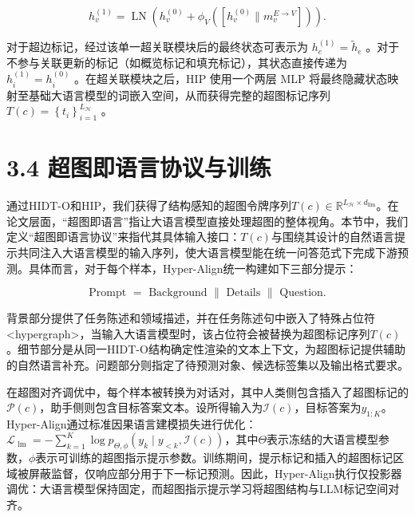 \documentclass[10pt]{article}
\begin{document}
\[
{h}_{v}^{\left( 1\right) } = \operatorname{LN}\left( {{h}_{v}^{\left( 0\right) } + {\phi }_{V}\left( \left\lbrack  {{h}_{v}^{\left( 0\right) }\parallel {m}_{v}^{E \rightarrow  V}}\right\rbrack  \right) }\right) . \tag{10}
\]

对于超边标记，经过该单一超关联模块后的最终状态可表示为 \({h}_{e}^{\left( 1\right) } = {\widetilde{h}}_{e}\) 。对于不参与关联更新的标记（如概览标记和填充标记），其状态直接传递为 \({h}_{i}^{\left( 1\right) } = {h}_{i}^{\left( 0\right) }\) 。在超关联模块之后，HIP 使用一个两层 MLP 将最终隐藏状态映射至基础大语言模型的词嵌入空间，从而获得完整的超图标记序列 \(T\left( c\right)  = {\left\{  {t}_{i}\right\}  }_{i = 1}^{{L}_{\mathcal{H}}}\) 。

\section*{3.4 超图即语言协议与训练}

通过HIDT-O和HIP，我们获得了结构感知的超图令牌序列\(T\left( c\right)  \in{\mathbb{R}}^{{L}_{\mathcal{H}} \times{d}_{\operatorname{llm}}}\)。在论文层面，“超图即语言”指让大语言模型直接处理超图的整体视角。本节中，我们定义“超图即语言协议”来指代其具体输入接口：\(T\left( c\right)\)与围绕其设计的自然语言提示共同注入大语言模型的输入序列，使大语言模型能在统一问答范式下完成下游预测。具体而言，对于每个样本，Hyper-Align统一构建如下三部分提示：

\[
\text{ Prompt } = \text{ Background }\parallel \text{ Details }\parallel \text{ Question. } \tag{11}
\]

背景部分提供了任务陈述和领域描述，并在任务陈述句中嵌入了特殊占位符<hypergraph>，当输入大语言模型时，该占位符会被替换为超图标记序列\(T\left( c\right)\)。细节部分是从同一HIDT-O结构确定性渲染的文本上下文，为超图标记提供辅助的自然语言补充。问题部分则指定了待预测对象、候选标签集以及输出格式要求。

在超图对齐调优中，每个样本被转换为对话对，其中人类侧包含插入了超图标记的\(\mathcal{P}\left( c\right)\)，助手侧则包含目标答案文本。设所得输入为\(\mathcal{I}\left( c\right)\)，目标答案为\({y}_{1 : K}\)。Hyper-Align通过标准因果语言建模损失进行优化：\({\mathcal{L}}_{\text{ lm }} =  - \mathop{\sum }\limits_{{k = 1}}^{K}\log{p}_{\Theta ,\phi }\left( {{y}_{k} \mid{y}_{ < k},\mathcal{I}\left( c\right) }\right)\)，其中\(\Theta\)表示冻结的大语言模型参数，\(\phi\)表示可训练的超图指示提示参数。训练期间，提示标记和插入的超图标记区域被屏蔽监督，仅响应部分用于下一标记预测。因此，Hyper-Align执行仅投影器调优：大语言模型保持固定，而超图指示提示学习将超图结构与LLM标记空间对齐。
\end{document}
